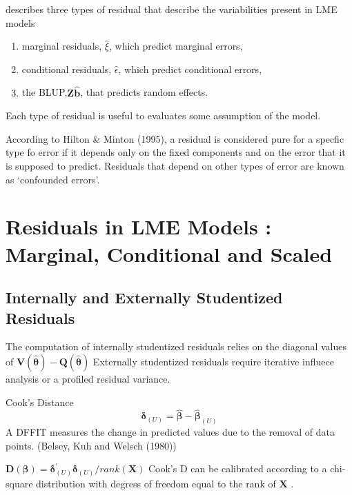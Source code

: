 \documentclass[12pt, a4paper]{report}
\theoremstyle{plain}
\theoremstyle{definition}
\theoremstyle{remark}
\begin{document}
	\citet{pb} describes three types of residual that describe the variabilities
	present in LME models
	\begin{enumerate}
		\item marginal residuals, $\hat{\xi}$, which predict marginal errors,
		\item conditional residuals, $\hat{\epsilon}$, which predict conditional errors,
		\item the BLUP,$\boldsymbol{Z\hat{b}}$, that predicts random effects.
	\end{enumerate}
	Each type of residual is useful to evaluates some assumption of the model.
	
	
	According to Hilton \& Minton (1995), a residual is considered pure for a specfic type fo error
	if it depends only on the fixed components and on the error that it is supposed to predict.
	Residuals that depend on other types of error are known as `confounded errors'.



	\section{Residuals in LME Models : Marginal, Conditional and Scaled}
\subsection{Internally and Externally Studentized Residuals}
The computation of internally studentized residuals relies on the diagonal values of $\boldsymbol{V(\hat{\theta})} - \boldsymbol{Q(\hat{\theta})}$
Externally studentized residuals require iterative influece analysis or a profiled residual variance.

Cook's Distance
\[ \boldsymbol{\delta}_{(U)} = \boldsymbol{\hat{\beta}}  - \boldsymbol{\hat{\beta}}_{(U)} \]
A DFFIT measures the change in predicted values due to the removal of data points.
(Belsey, Kuh and Welsch (1980))

$\boldsymbol{D(\beta)}  = \boldsymbol{\delta}^{\prime}_{(U)} \boldsymbol{\delta}_{(U)} / rank(\boldsymbol{X})$
Cook's D can be calibrated according to a chi-square distribution with degress of freedom equal to the rank of $\boldsymbol{X}$ \citet{CPJ}.
\end{document}
